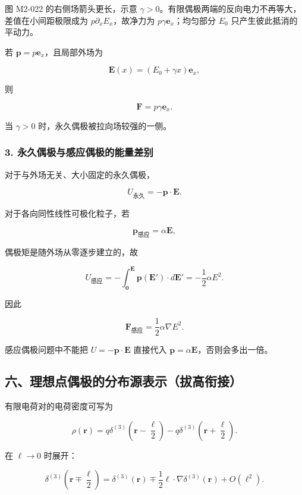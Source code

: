 图 M2-022 的右侧场箭头更长，示意
\(\gamma>0\)。有限偶极两端的反向电力不再等大，差值在小间距极限成为
\(p\partial_xE_x\)，故净力为 \(p\gamma\mathbf e_x\)；均匀部分 \(E_0\)
只产生彼此抵消的平动力。

若 \(\mathbf p=p\mathbf e_x\)，且局部外场为

\[
\mathbf E(x)=(E_0+\gamma x)\mathbf e_x,
\]

则

\[
\mathbf F=p\gamma\mathbf e_x.
\]

当 \(\gamma>0\) 时，永久偶极被拉向场较强的一侧。

\subsubsection{3.
永久偶极与感应偶极的能量差别}\label{m2:ux6c38ux4e45ux5076ux6781ux4e0eux611fux5e94ux5076ux6781ux7684ux80fdux91cfux5deeux522b}

对于与外场无关、大小固定的永久偶极，

\[
U_{\mathrm{\text{永久}}}=-\mathbf p\cdot\mathbf E.
\]

对于各向同性线性可极化粒子，若

\[
\mathbf p_{\mathrm{\text{感应}}}=\alpha\mathbf E,
\]

偶极矩是随外场从零逐步建立的，故

\[
U_{\mathrm{\text{感应}}}
=-\int_{\mathbf0}^{\mathbf E}\mathbf p(\mathbf E')\cdot d\mathbf E'
=-\frac12\alpha E^2.
\]

因此

\[
\boxed{
\mathbf F_{\mathrm{\text{感应}}}
=\frac12\alpha\nabla E^2
}.
\]

感应偶极问题中不能把 \(U=-\mathbf p\cdot\mathbf E\) 直接代入
\(\mathbf p=\alpha\mathbf E\)，否则会多出一倍。

\subsection{六、理想点偶极的分布源表示（拔高衔接）}\label{m2:ux516dux7406ux60f3ux70b9ux5076ux6781ux7684ux5206ux5e03ux6e90ux8868ux793aux62d4ux9ad8ux8854ux63a5}

有限电荷对的电荷密度可写为

\[
\rho(\mathbf r)
=q\delta^{(3)}\!\left(\mathbf r-\frac{\boldsymbol{\ell}}2\right)
-q\delta^{(3)}\!\left(\mathbf r+\frac{\boldsymbol{\ell}}2\right).
\]

在 \(\ell\to0\) 时展开：

\[
\delta^{(3)}\!\left(\mathbf r\mp\frac{\boldsymbol{\ell}}2\right)
=\delta^{(3)}(\mathbf r)
\mp\frac12\boldsymbol{\ell}\cdot\nabla\delta^{(3)}(\mathbf r)
+O(\ell^2).
\]

